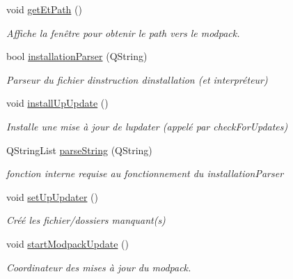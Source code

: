 \begin{DoxyCompactItemize}
\mbox{\label{classmainWindow_a072f18613ff572bc7554b93a4904fd14}} 
void \hyperlink{classmainWindow_a072f18613ff572bc7554b93a4904fd14}{get\+Et\+Path} ()
\begin{DoxyCompactList}\small\item\em Affiche la fenêtre pour obtenir le path vers le modpack. \end{DoxyCompactList}\item 
bool \hyperlink{classmainWindow_abb015d99703b6a2624fc2d543a10552d}{installation\+Parser} (Q\+String)
\begin{DoxyCompactList}\small\item\em Parseur du fichier d\textquotesingle{}instruction d\textquotesingle{}installation (et interpréteur) \end{DoxyCompactList}\item 
void \hyperlink{classmainWindow_a0f3534bb135c2bc4e3c1ff351a004fb6}{install\+Up\+Update} ()
\begin{DoxyCompactList}\small\item\em Installe une mise à jour de l\textquotesingle{}updater (appelé par check\+For\+Updates) \end{DoxyCompactList}\item 
Q\+String\+List \hyperlink{classmainWindow_a5eed4f5e05f3553c3318d8ce8a3dd94d}{parse\+String} (Q\+String)
\begin{DoxyCompactList}\small\item\em fonction interne requise au fonctionnement du installation\+Parser \end{DoxyCompactList}\item 
\mbox{\label{classmainWindow_a8c0cf5a7e8b00a7bfd152437d0a97269}} 
void \hyperlink{classmainWindow_a8c0cf5a7e8b00a7bfd152437d0a97269}{set\+Up\+Updater} ()
\begin{DoxyCompactList}\small\item\em Créé les fichier/dossiers manquant(s) \end{DoxyCompactList}\item 
\mbox{\label{classmainWindow_a0ddc815f8dd62fe0edb3bd07badce660}} 
void \hyperlink{classmainWindow_a0ddc815f8dd62fe0edb3bd07badce660}{start\+Modpack\+Update} ()
\begin{DoxyCompactList}\small\item\em Coordinateur des mises à jour du modpack. \end{DoxyCompactList}\item 

\end{DoxyCompactItemize}
